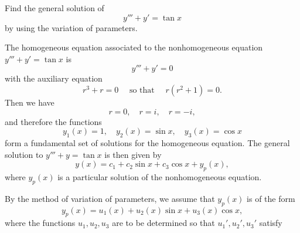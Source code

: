 \begin{example}
 Find the general solution of 
		\[y''' + y' = \tan x\] by using the variation of parameters.
\end{example}

\begin{solution}
		The homogeneous equation associated to the nonhomogeneous  equation \(y''' + y' = \tan x\) is
		\[
		y''' + y' = 0
		\]
		with the auxiliary equation 
		\[
		r^3 + r = 0 \quad \text{ so that } \quad r(r^2 + 1) = 0.
		\]
	Then we have
		\[
		r = 0, \quad r = i, \quad r = -i,
		\]
	and therefore the functions
		\[
		y_1(x) = 1, \quad
		y_2(x) = \sin x, \quad
		y_3(x) = \cos x
		\]
		form a fundamental set of solutions for  the homogeneous equation. 
The general solution to $y'''+y= \tan x$ is then given by
		\[
		y(x) = c_1 + c_2 \sin x + c_3 \cos x + y_p(x),
		\]
where $y_p(x)$ is a particular solution of the nonhomogeneous equation.

By the method of variation of parameters, we assume that $y_p(x)$ is of the form
		\[
		y_p(x) = u_1(x) + u_2(x) \sin x + u_3(x) \cos x,
		\]
where the functions $u_1, u_2, u_3$ are to be determined so that $u_1', u_2', u_3'$ satisfy
		

\end{solution}
